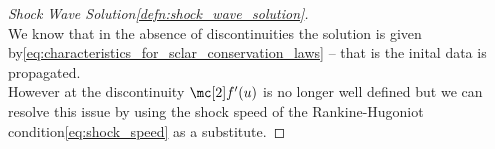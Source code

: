 \begin{proofbox}\nospacing
    \begin{proof}[Shock Wave Solution\cref{defn:shock_wave_solution}]\label{proof:defn:shock_wave_solution}\leavevmode\\
        We know that in the absence of discontinuities the solution is given by\cref{eq:characteristics_for_sclar_conservation_laws}
        -- that is the inital data is propagated.\\
        However at the discontinuity $\flux'(u)$ is no longer well defined but we can resolve this issue by using the shock speed
        of the Rankine-Hugoniot condition\cref{eq:shock_speed} as a substitute.
    \end{proof}
\end{proofbox}
